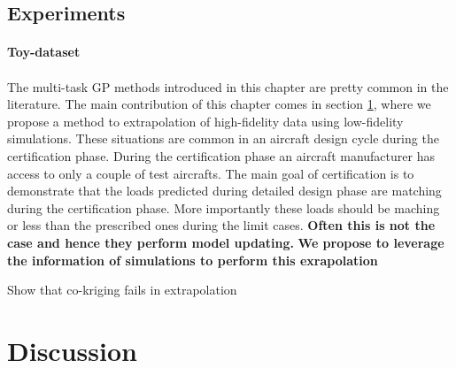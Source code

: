 \subsection{Experiments}

\paragraph{Toy-dataset}

\paragraph{}
The multi-task GP methods introduced in this chapter are pretty common in the literature. The main contribution of this chapter comes in section \ref{}, where we propose a method to extrapolation of high-fidelity data using low-fidelity simulations. These situations are common in an aircraft design cycle during the certification phase. During the certification phase an aircraft manufacturer has access to only a couple of test aircrafts. The main goal of certification is to demonstrate that the loads predicted during detailed design phase are matching during the certification phase. More importantly these loads should be maching or less than the prescribed ones during the limit cases. 
\textbf{Often this is not the case and hence they perform model updating.}
\textbf{We propose to leverage the information of simulations to perform this exrapolation}


Show that co-kriging fails in extrapolation


\section{Discussion}
